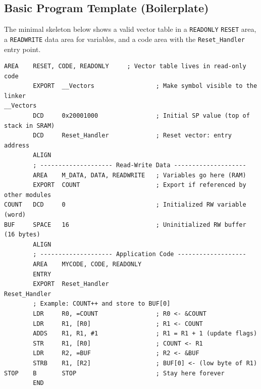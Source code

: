 \clearpage
\subsection{Basic Program Template (Boilerplate)}

The minimal skeleton below shows a valid vector table in a \texttt{READONLY} \texttt{RESET} area, a \texttt{READWRITE} data area for variables, and a code area with the \texttt{Reset\_Handler} entry point.

\begin{lstlisting}[caption={Cortex-M4 boilerplate with READWRITE data}]
        AREA    RESET, CODE, READONLY     ; Vector table lives in read-only code
        EXPORT  __Vectors                 ; Make symbol visible to the linker
__Vectors
        DCD     0x20001000                ; Initial SP value (top of stack in SRAM)
        DCD     Reset_Handler             ; Reset vector: entry address
        ALIGN        
        ; -------------------- Read-Write Data --------------------
        AREA    M_DATA, DATA, READWRITE   ; Variables go here (RAM)
        EXPORT  COUNT                     ; Export if referenced by other modules
COUNT   DCD     0                         ; Initialized RW variable (word)
BUF     SPACE   16                        ; Uninitialized RW buffer (16 bytes)
        ALIGN        
        ; -------------------- Application Code -------------------
        AREA    MYCODE, CODE, READONLY
        ENTRY
        EXPORT  Reset_Handler
Reset_Handler
        ; Example: COUNT++ and store to BUF[0]
        LDR     R0, =COUNT                ; R0 <- &COUNT
        LDR     R1, [R0]                  ; R1 <- COUNT
        ADDS    R1, R1, #1                ; R1 = R1 + 1 (update flags)
        STR     R1, [R0]                  ; COUNT <- R1        
        LDR     R2, =BUF                  ; R2 <- &BUF
        STRB    R1, [R2]                  ; BUF[0] <- (low byte of R1)
STOP    B       STOP                      ; Stay here forever
        END
\end{lstlisting}

